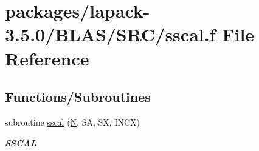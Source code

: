 \hypertarget{lapack-3_85_80_2BLAS_2SRC_2sscal_8f}{}\section{packages/lapack-\/3.5.0/\+B\+L\+A\+S/\+S\+R\+C/sscal.f File Reference}
\label{lapack-3_85_80_2BLAS_2SRC_2sscal_8f}
\subsection*{Functions/\+Subroutines}
\begin{DoxyCompactItemize}
\item 
subroutine \hyperlink{group__single__blas__level1_ga3252f1f70b29d59941e9bc65a6aefc0a}{sscal} (\hyperlink{polmisc_8c_a0240ac851181b84ac374872dc5434ee4}{N}, S\+A, S\+X, I\+N\+C\+X)
\begin{DoxyCompactList}\small\item\em {\bfseries S\+S\+C\+A\+L} \end{DoxyCompactList}\end{DoxyCompactItemize}
